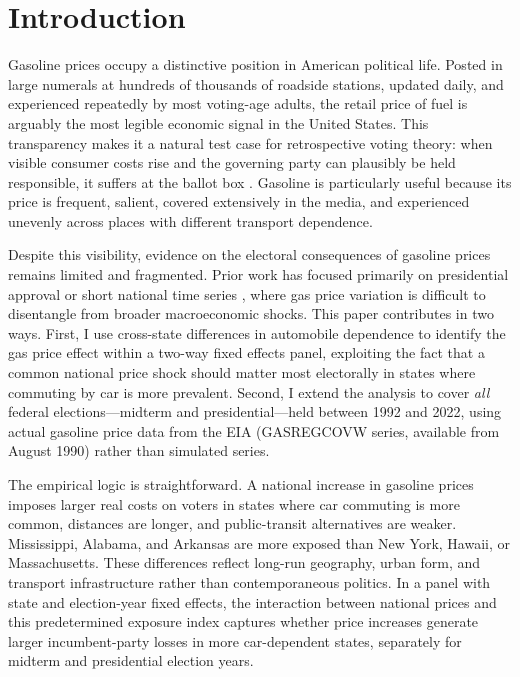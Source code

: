 \documentclass[12pt]{article}
\begin{document}
\newpage
\setcounter{page}{1}

\section{Introduction}
\label{sec:intro}

Gasoline prices occupy a distinctive position in American political life. Posted in large numerals at hundreds of thousands of roadside stations, updated daily, and experienced repeatedly by most voting-age adults, the retail price of fuel is arguably the most legible economic signal in the United States. This transparency makes it a natural test case for retrospective voting theory: when visible consumer costs rise and the governing party can plausibly be held responsible, it suffers at the ballot box \citep{Fiorina1981, Lewis-Beck1988}. Gasoline is particularly useful because its price is frequent, salient, covered extensively in the media, and experienced unevenly across places with different transport dependence.

Despite this visibility, evidence on the electoral consequences of gasoline prices remains limited and fragmented. Prior work has focused primarily on presidential approval or short national time series \citep{Ansolabehere2014, Healy2010}, where gas price variation is difficult to disentangle from broader macroeconomic shocks. This paper contributes in two ways. First, I use cross-state differences in automobile dependence to identify the gas price effect within a two-way fixed effects panel, exploiting the fact that a common national price shock should matter most electorally in states where commuting by car is more prevalent. Second, I extend the analysis to cover \textit{all} federal elections---midterm and presidential---held between 1992 and 2022, using actual gasoline price data from the EIA (GASREGCOVW series, available from August 1990) rather than simulated series.

The empirical logic is straightforward. A national increase in gasoline prices imposes larger real costs on voters in states where car commuting is more common, distances are longer, and public-transit alternatives are weaker. Mississippi, Alabama, and Arkansas are more exposed than New York, Hawaii, or Massachusetts. These differences reflect long-run geography, urban form, and transport infrastructure rather than contemporaneous politics. In a panel with state and election-year fixed effects, the interaction between national prices and this predetermined exposure index captures whether price increases generate larger incumbent-party losses in more car-dependent states, separately for midterm and presidential election years.
\end{document}

